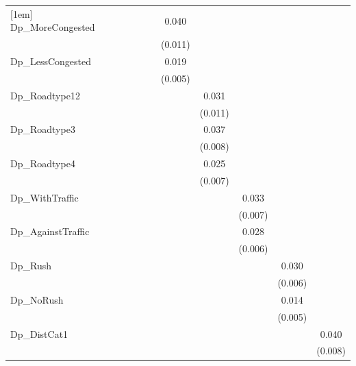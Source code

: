 \begin{table}[htbp]
\begin{tabular}{l*{9}{c}}
[1em]
Dp\_MoreCongested&       &       &       &       &  0.040&       &       &       &       \\
            &       &       &       &       &(0.011)&       &       &       &       \\
[1em]
Dp\_LessCongested&       &       &       &       &  0.019&       &       &       &       \\
            &       &       &       &       &(0.005)&       &       &       &       \\
[1em]
Dp\_Roadtype12&       &       &       &       &       &  0.031&       &       &       \\
            &       &       &       &       &       &(0.011)&       &       &       \\
[1em]
Dp\_Roadtype3&       &       &       &       &       &  0.037&       &       &       \\
            &       &       &       &       &       &(0.008)&       &       &       \\
[1em]
Dp\_Roadtype4&       &       &       &       &       &  0.025&       &       &       \\
            &       &       &       &       &       &(0.007)&       &       &       \\
[1em]
Dp\_WithTraffic&       &       &       &       &       &       &  0.033&       &       \\
            &       &       &       &       &       &       &(0.007)&       &       \\
[1em]
Dp\_AgainstTraffic&       &       &       &       &       &       &  0.028&       &       \\
            &       &       &       &       &       &       &(0.006)&       &       \\
[1em]
Dp\_Rush     &       &       &       &       &       &       &       &  0.030&       \\
            &       &       &       &       &       &       &       &(0.006)&       \\
[1em]
Dp\_NoRush   &       &       &       &       &       &       &       &  0.014&       \\
            &       &       &       &       &       &       &       &(0.005)&       \\
[1em]
Dp\_DistCat1 &       &       &       &       &       &       &       &       &  0.040\\
            &       &       &       &       &       &       &       &       &(0.008)\\

\end{tabular}
\end{table}
